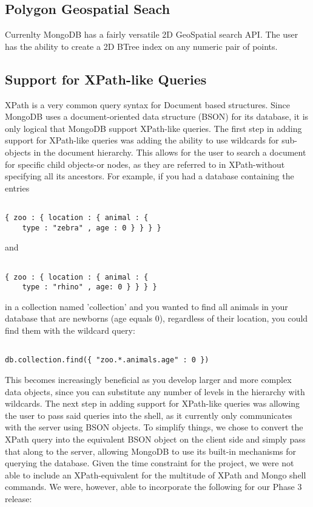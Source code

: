 \documentclass{../dependencies/acm_proc_article-sp}
\begin{document}
\subsection{Polygon Geospatial Seach}
Currenlty MongoDB has a fairly versatile 2D GeoSpatial search API.
The user has the ability to create a 2D BTree index on any numeric pair of points.

\subsection{Support for XPath-like Queries}
XPath is a very common query syntax for Document based structures. Since MongoDB uses a document-oriented data structure (BSON) for its database, it is only logical that MongoDB support XPath-like queries. The first step in adding support for XPath-like queries was adding the ability to use wildcards for sub-objects in the document hierarchy. This allows for the user to search a document for specific child objects-or nodes, as they are referred to in XPath-without specifying all its ancestors. For example, if you had a database containing the entries

\begin{lstlisting}

{ zoo : { location : { animal : {
    type : "zebra" , age : 0 } } } }
\end{lstlisting}

and

\begin{lstlisting}

{ zoo : { location : { animal : {
    type : "rhino" , age: 0 } } } }
\end{lstlisting}

in a collection named 'collection' and you wanted to find all animals in your database that are newborns (age equals 0), regardless of their location, you could find them with the wildcard query:

\begin{lstlisting}

db.collection.find({ "zoo.*.animals.age" : 0 })
\end{lstlisting}

This becomes increasingly beneficial as you develop larger and more complex data objects, since you can substitute any number of levels in the hierarchy with wildcards. The next step in adding support for XPath-like queries was allowing the user to pass said queries into the shell, as it currently only communicates with the server using BSON objects. To simplify things, we chose to convert the XPath query into the equivalent BSON object on the client side and simply pass that along to the server, allowing MongoDB to use its built-in mechanisms for querying the database. Given the time constraint for the project, we were not able to include an XPath-equivalent for the multitude of XPath and Mongo shell commands. We were, however, able to incorporate the following for our Phase 3 release:
\end{document}
